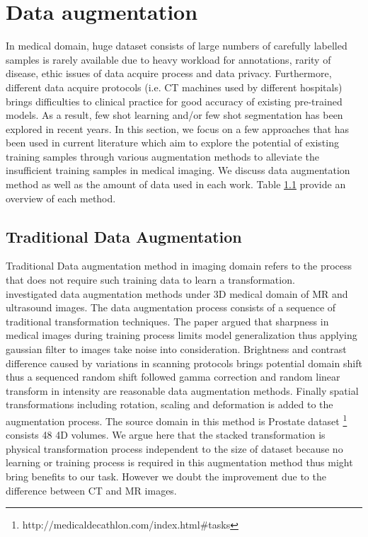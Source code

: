 
\section{Data augmentation}
In medical domain, huge dataset consists of large numbers of carefully labelled samples is rarely available due to heavy workload for annotations, rarity of disease, ethic issues of data acquire process and data privacy. Furthermore, different data acquire protocols (i.e. CT machines used by different hospitals) brings difficulties to clinical practice for good accuracy of existing pre-trained models. As a result, few shot learning and/or few shot segmentation has been explored in recent years. 
In this section, we focus on a few approaches that has been used in current literature which aim to explore the potential of existing training samples through various augmentation methods to alleviate the insufficient training samples in medical imaging. We discuss data augmentation method as well as the amount of data used in each work. Table \ref{} provide an overview of each method.

\subsection{Traditional Data Augmentation}
Traditional Data augmentation method in imaging domain refers to the process that does not require such training data to learn a transformation.\\

\cite{zhang_when_2019} investigated data augmentation methods under 3D medical domain of MR and ultrasound images. 
The data augmentation process consists of a sequence of traditional transformation techniques. The paper argued that sharpness in medical images during training process limits model generalization thus applying gaussian filter to images take noise into consideration. Brightness and contrast difference caused by variations in scanning protocols brings potential domain shift thus a sequenced random shift followed gamma correction and random linear transform in intensity are reasonable data augmentation methods. Finally spatial transformations including rotation, scaling and deformation is added to the augmentation process.
The source domain in this method is Prostate dataset \footnote{http://medicaldecathlon.com/index.html\#tasks} consists 48 4D volumes.
We argue here that the stacked transformation is physical transformation process independent to the size of dataset because no learning or training process is required in this augmentation method thus might bring benefits to our task. However we doubt the improvement due to the difference between CT and MR images.\\

